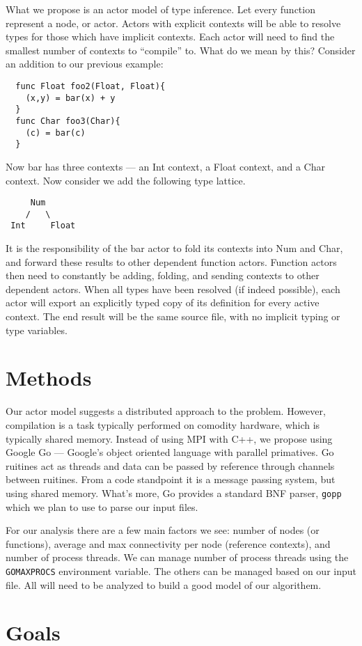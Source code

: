 \documentclass{article}[9pt]
\begin{document}
What we propose is an actor model of type inference. Let every
function represent a node, or actor. Actors with explicit contexts
will be able to resolve types for those which have implicit
contexts. Each actor will need to find the smallest number of contexts
to ``compile'' to. What do we mean by this? Consider an addition to our
previous example: 
\begin{lstlisting}
  func Float foo2(Float, Float){
    (x,y) = bar(x) + y
  }
  func Char foo3(Char){
    (c) = bar(c)
  }
\end{lstlisting}
Now bar has three contexts --- an Int context, a Float context, and a
Char context. Now consider we add the following type lattice. 
\begin{verbatim}
     Num
    /   \
 Int     Float
\end{verbatim}
It is the responsibility of the bar actor to fold its contexts into
Num and Char, and forward these results to other dependent function
actors. Function actors then need to constantly be adding, folding,
and sending contexts to other dependent actors. 
When all types have been resolved (if indeed possible), each actor
will export an explicitly typed copy of its definition for every
active context. The end result will be the same source file, with no
implicit typing or type variables. 

\section*{Methods}
Our actor model suggests a distributed approach to the
problem. However, compilation is a task typically performed on
comodity hardware, which is typically shared memory. Instead of using
MPI with C++, we propose using Google Go --- Google's object oriented
language with parallel primatives. Go ruitines act as threads and data
can be passed by reference through channels between ruitines. From a
code standpoint it is a message passing system, but using shared
memory. What's more, Go provides a standard BNF parser, \texttt{gopp}
which we plan to use to parse our input files.

For our analysis there are a few main factors we see: number of nodes
(or functions), average and max connectivity per node (reference
contexts), and number of process threads. We can manage number of
process threads using the \texttt{GOMAXPROCS} environment
variable. The others can be managed based on our input file. All will
need to be analyzed to build a good model of our algorithem.

\section*{Goals}
\end{document}
